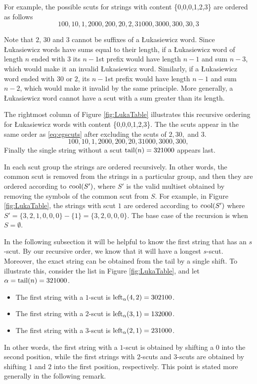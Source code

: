For example, 
the possible scuts for strings with content \{0,0,0,1,2,3\} are ordered as follows
\begin{equation} \label{eq:egscuts}
100, 10, 1, 2000, 200, 20, 2, 31000, 3000, 300, 30, 3
\end{equation}

Note that $2$, $30$ and $3$ cannot be suffixes of a Łukasiewicz word. Since Łukasiewicz words have sums equal to their length, if a Łukasiewicz word of length $n$ ended with $3$ its $n-1$st prefix would have length $n-1$ and sum $n-3$, which would make it an invalid Łukasiewicz word. Similarly, if a Łukasiewicz word ended with $30$ or $2$, its $n-1$st prefix would have length $n-1$ and sum $n-2$, which would make it invalid by the same principle.  More generally, a Łukasiewicz word cannot have a scut with a sum greater than its length.

The rightmost column of Figure \ref{fig:LukaTable} illustrates this recursive ordering for Łukasiewicz words with content \{0,0,0,1,2,3\}.
The the scuts appear in the same order as \eqref{eq:egscuts} after excluding the scuts of $2, 30,$ and $3$.
\begin{equation} \label{eq:scuts}
100, 10, 1, 2000, 200, 20, 31000, 3000, 300,    
\end{equation}
Finally the single string without a scut $\tail(n) = 321000$ appears last.

In each scut group the strings are ordered recursively.
In other words, the common scut is removed from the strings in a particular group, and then they are ordered according to $\cool{S'}$, where $S'$ is the valid multiset obtained by removing the symbols of the common scut from $S$.
For example, in Figure \ref{fig:LukaTable}, the strings with scut $1$ are ordered according to $\cool{S'}$ where $S' = \{3,2,1,0,0,0\} - \{1\} = \{3,2,0,0,0\}$.
The base case of the recursion is when $S = \emptyset$.

In the following subsection it will be helpful to know the first string that has an $s$-scut.
By our recursive order, we know that it will have a longest $s$-scut.
Moreover, the exact string can be obtained from the tail by a single shift.
To illustrate this, consider the list in Figure \ref{fig:LukaTable}, and let $\alpha = \tail(n) = 321000$.
\begin{itemize}
    \item The first string with a $1$-scut is $\lshiftindex[\alpha]{4}{2} = 302100$.
    \item The first string with a $2$-scut is $\lshiftindex[\alpha]{3}{1} = 132000$.
    \item The first string with a $3$-scut is $\lshiftindex[\alpha]{2}{1} = 231000$.
\end{itemize}
In other words, the first string with a $1$-scut is obtained by shifting a $0$ into the second position, while the first strings with $2$-scuts and $3$-scuts are obtained by shifting $1$ and $2$ into the first position, respectively.
This point is stated more generally in the following remark.

